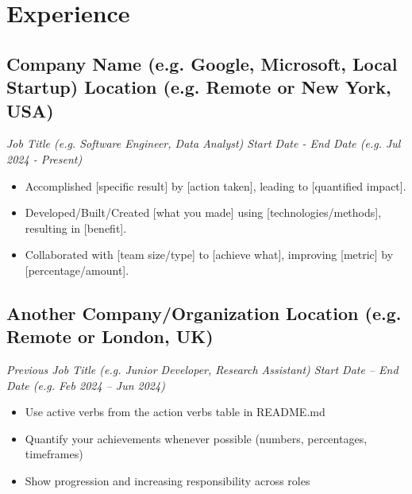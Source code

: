 \documentclass[a4paper,10pt]{article}
\begin{document}
\section{Experience}
    \subsection*{\texorpdfstring{
        \textbf{Company Name (e.g. Google, Microsoft, Local Startup)} \hfill Location (e.g. Remote or New York, USA)
        }{
            Company Name -- Location
        }}
    \textit{Job Title (e.g. Software Engineer, Data Analyst) \hfill Start Date - End Date (e.g. Jul 2024 - Present)}
        \begin{itemize} 
            \item Accomplished [specific result] by [action taken], leading to [quantified impact].
            \item Developed/Built/Created [what you made] using [technologies/methods], resulting in [benefit].
            \item Collaborated with [team size/type] to [achieve what], improving [metric] by [percentage/amount].
        \end{itemize}

    \subsection*{\texorpdfstring{
        \textbf{Another Company/Organization} \hfill Location (e.g. Remote or London, UK)
        }{
            Another Company/Organization -- Location
        }}
    \textit{Previous Job Title (e.g. Junior Developer, Research Assistant) \hfill Start Date – End Date (e.g. Feb 2024 – Jun 2024)}
        \begin{itemize}
            \item Use active verbs from the action verbs table in README.md
            \item Quantify your achievements whenever possible (numbers, percentages, timeframes)
            \item Show progression and increasing responsibility across roles
        \end{itemize}
        
\end{document}
